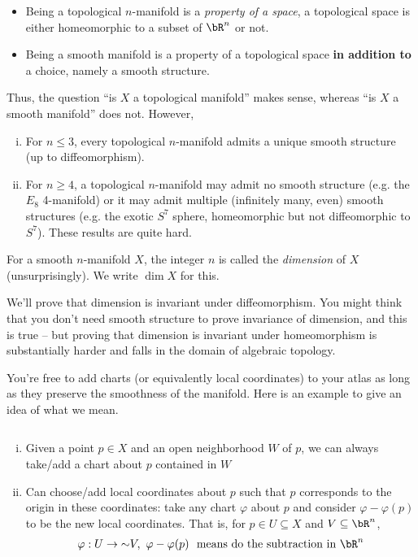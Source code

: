 \begin{rmk}\label{rmk:top-vs-smooth-manifold}$ $
	\begin{itemize}
		\item Being a topological $n$-manifold is a \emph{property of a space}, a topological space is either homeomorphic to a subset of $\bR^n$ or not.
		\item Being a smooth manifold is a property of a topological space \textbf{in addition to} a choice, namely a smooth structure.
	\end{itemize}
	Thus, the question ``is $X$ a topological manifold'' makes sense, whereas ``is $X$ a smooth manifold'' does not. However,
	\begin{enumerate}[(i)]
		\item For $n \leq 3$, every topological $n$-manifold admits a unique smooth structure (up to diffeomorphism).
		\item For $n \geq 4$, a topological $n$-manifold may admit no smooth structure (e.g. the $E_8$ 4-manifold) or it may admit multiple (infinitely many, even) smooth structures (e.g. the exotic $S^7$ sphere, homeomorphic but not diffeomorphic to $S^7$). These results are quite hard.
	\end{enumerate}
\end{rmk}


\begin{defn}\label{defn:dimension-of-manifold}
	For a smooth $n$-manifold $X$, the integer $n$ is called the \emph{dimension} of $X$ (unsurprisingly). We write $\dim X$ for this.
\end{defn}

We'll prove that dimension is invariant under diffeomorphism. You might think that you don't need smooth structure to prove invariance of dimension, and this is true -- but proving that dimension is invariant under homeomorphism is substantially harder and falls in the domain of algebraic topology.

You're free to add charts (or equivalently local coordinates) to your atlas as long as they preserve the smoothness of the manifold. Here is an example to give an idea of what we mean.

\begin{example}\label{expl:add-charts-to-atlas}
	$ $
	\begin{enumerate}[(i)]
		\item Given a point $p \in X$ and an open neighborhood $W$ of $p$, we can always take/add a chart about $p$ contained in $W$
		\item Can choose/add local coordinates about $p$ such that $p$ corresponds to the origin in these coordinates: take any chart $\varphi$ about $p$ and consider $\varphi - \varphi(p)$ to be the new local coordinates. That is, for $p \in U \subseteq X$ and $V \subseteq \bR^n$,
			\begin{align*}
				\varphi:U \to{\sim} V, ~ \varphi - \varphi(p) ~\text{ means do the subtraction in  } \bR^n
			\end{align*}
	\end{enumerate}
\end{example}

